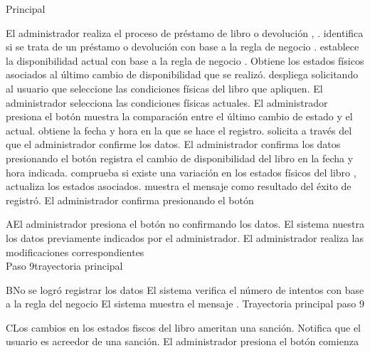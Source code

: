 	\begin{UCtrayectoria}{Principal}

	\UCpaso[\UCactor] El administrador realiza el proceso de préstamo de libro o devolución  , .
	\UCpaso[\UCsist]   identifica si se trata de un préstamo o devolución con base a la regla de negocio .
 	\UCpaso[\UCsist]  establece la disponibilidad actual con base a la regla de negocio   .
	\UCpaso[\UCsist]  Obtiene los estados físicos asociados al último cambio de disponibilidad que se realizó.
	\UCpaso[\UCsist] despliega  solicitando al usuario que seleccione las  condiciones físicas del libro que apliquen.
	\UCpaso[\UCactor]El administrador selecciona las condiciones físicas actuales.
	\UCpaso[\UCactor] El administrador presiona el botón 
	\UCpaso[\UCsist]  muestra la comparación entre el último cambio de estado y el actual.
	\UCpaso[\UCsist] obtiene la fecha y hora en la que se hace el registro.
	\UCpaso[\UCsist] solicita a través del   que el administrador confirme los datos.
	\UCpaso[\UCactor] El administrador confirma los datos presionando el botón  
	\UCpaso[\UCsist] registra el cambio de disponibilidad del libro en la fecha y hora indicada.
	\UCpaso[\UCsist] comprueba si existe una variación en los estados físicos del libro , actualiza los estados asociados.
	\UCpaso[\UCsist] muestra el mensaje  como resultado del éxito de registró.
	\UCpaso[\UCactor] El administrador confirma presionando el botón  
			
	\end{UCtrayectoria}		
			
			
		\begin{UCtrayectoriaA}{A}{El administrador presiona el botón  no confirmando los datos.}
			\UCpaso[\UCsist] El sistema nuestra los datos previamente indicados por el administrador.
			\UCpaso[\UCactor] El administrador realiza las modificaciones correspondientes 
			\\ Paso 9trayectoria principal 
		\end{UCtrayectoriaA}
		\begin{UCtrayectoriaA}{B}{No se logró registrar los datos }
			\UCpaso[\UCsist] El sistema verifica el número de intentos con base a la regla del negocio 
			\UCpaso[\UCsist] El sistema muestra el mensaje .
			Trayectoria principal paso 9
		\end{UCtrayectoriaA}
		\begin{UCtrayectoriaA}{C}{Los cambios en los estados fiscos del libro ameritan una sanción. }
			\UCpaso[\UCsist] Notifica que el usuario es acreedor de una sanción.
			\UCpaso[\UCsist] El administrador presiona el botón 
			\UCpaso[\UCsist] comienza 
		\end{UCtrayectoriaA}
	



